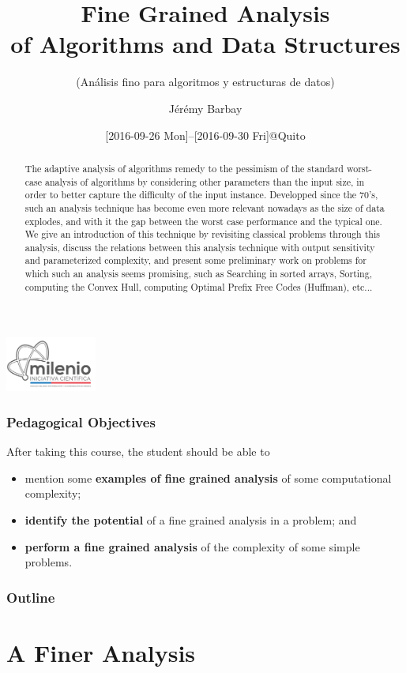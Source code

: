 \documentclass{beamer}
\title[Fine Grained Analysis]
{Fine Grained Analysis \\ of Algorithms and Data Structures}
\subtitle{(An\'alisis fino para algoritmos y  estructuras de datos)}
\author{J{\'e}r{\'e}my Barbay}
\institute[DCC, UChile]
{\url{jeremy@barbay.cl}}
\date[Quito]{[2016-09-26 Mon]--[2016-09-30 Fri]@Quito}
\begin{document}
\begin{frame}
  \titlepage
\end{frame}

\begin{frame}
\includegraphics[width=3cm]{logoMilenio}
\vfill
\begin{abstract} \tiny The adaptive analysis of algorithms remedy to the pessimism of the standard worst-case analysis of algorithms by considering other parameters than the input size, in order to better capture the difficulty of the input instance. Developped since the 70's, such an analysis technique has become even more relevant nowadays as the size of data explodes, and with it the gap between the worst case performance and the typical one. We give an introduction of this technique by revisiting classical problems through this analysis, discuss the relations between this analysis technique with output sensitivity and parameterized complexity, and present some preliminary work on problems for which such an analysis seems promising, such as Searching in sorted arrays, Sorting, computing the Convex Hull, computing Optimal Prefix Free Codes (Huffman), etc...
\end{abstract}
\vfill
\end{frame}

\begin{frame}
\frametitle{Pedagogical Objectives}
After taking this course, the student should be able to
\hfill
\begin{itemize}
\item mention some \textbf{examples of fine grained analysis} of some computational complexity;
\item \textbf{identify the potential} of a fine grained analysis in a problem; and
\item \textbf{perform a fine grained analysis} of the complexity of some simple problems.
\end{itemize}
\end{frame}


\begin{frame}
\frametitle{Outline}
\tableofcontents
\end{frame}


\section{A Finer Analysis}
\end{document}
